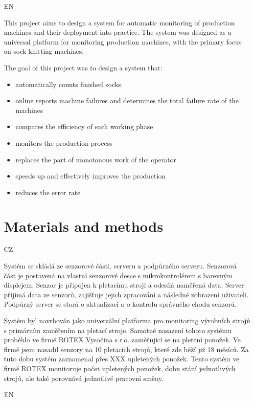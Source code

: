 \documentclass[12pt, a4paper]{article}
\begin{document}
EN

This project aims to design a system for automatic monitoring of production machines and their deployment into practice.
The system was designed as a universal platform for monitoring production machines, with the primary focus on sock knitting machines.

The goal of this project was to design a system that:

\begin{itemize}
    \item automatically counts finished socks
    \item online reports machine failures and determines the total failure rate of the machines
    \item compares the efficiency of each working phase
    \item monitors the production process
    \item replaces the part of monotonous work of the operator
    \item speeds up and effectively improves the production
    \item reduces the error rate
\end{itemize}


\section*{Materials and methods}
CZ

Systém se skládá ze senzorové části, serveru a podpůrného serveru.
Senzorová část je postavená na vlastní senzorové desce s mikrokontrolérem s barevným displejem.
Senzor je připojen k pletacímu stroji a odesílá naměřená data.
Server přijímá  data ze senzorů, zajišťuje jejich zpracování a následné zobrazení uživateli.
Podpůrný server se stará o aktualizaci a o kontrolu správného chodu senzorů.

Systém byl navrhován jako univerzální platforma pro monitoring výrobních strojů s primárním zaměřením na pletací stroje.
Samotné nasazení tohoto systému proběhlo ve firmě ROTEX Vysočina s.r.o. zaměřující se na pletení ponožek.
Ve firmě jsem nasadil senzory na 10 pletacích strojů, které zde běží již 18 měsíců.
Za tuto dobu systém zaznamenal přes XXX upletených ponožek.
Tento systém ve firmě ROTEX monitoruje počet upletených ponožek, dobu stání jednotlivých strojů, ale také porovnává jednotlivé pracovní směny.

EN
\end{document}
